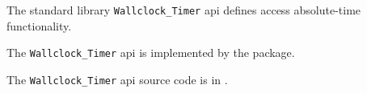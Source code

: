 
The standard library {\tt Wallclock\_Timer} api defines access absolute-time functionality.

The {\tt Wallclock\_Timer} api is implemented by the  package.

The {\tt Wallclock\_Timer} api source code is in .
